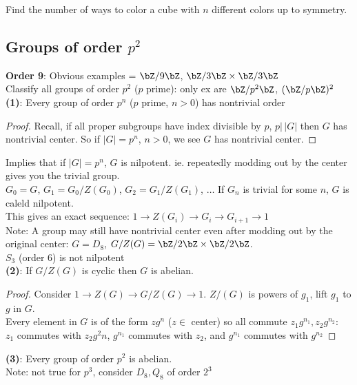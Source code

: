 \begin{example}
    Find the number of ways to color a cube with $n$ different colors up to symmetry. 
\end{example}

\subsection{Groups of order $p^2$} 

\textbf{Order 9}: Obvious examples = $\bZ/9\bZ$, $\bZ/3\bZ \times \bZ/3\bZ$ \\

\noindent
Classify all groups of order $p^2$ ($p$ prime): only ex are $\bZ/p^2\bZ$, $(\bZ/p\bZ)^2$ \\
\textbf{(1)}: Every group of order $p^n$ ($p$ prime, $n >0$) has nontrivial order 
\begin{proof}
        Recall, if all proper subgroups have index divisible by $p$, $p | \, |G|$ then $G$ has nontrivial center. So if $|G|=p^n$, $n>0$, we see $G$ has nontrivial center. 
\end{proof} 

\noindent
Implies that if $|G|=p^n$, $G$ is nilpotent. ie. repeatedly modding out by the center gives you the trivial group. \\
$G_0 = G$, $G_1 = G_0/Z(G_0)$, $G_2 = G_1/Z(G_1)$, $\ldots$ If $G_n$ is trivial for some $n$, $G$ is caleld nilpotent. \\
This gives an exact sequence: $1 \to Z(G_i) \to G_i \to G_{i+1} \to 1$ \\
Note: A group may still have nontrivial center even after modding out by the original center: $G= D_8$, $G/Z(G) = \bZ/2\bZ \times \bZ/2\bZ$. \\
$S_3$ (order 6) is not nilpotent \\

\noindent
\textbf{(2)}: If $G/Z(G)$ is cyclic then $G$ is abelian. 

\begin{proof}
    Consider $1 \to Z(G) \to G/Z(G) \to 1$. $Z/(G)$ is powers of $g_1$, lift $g_1$ to $g$ in $G$. \\
    Every element in $G$ is of the form $zg^n$ ($z \in$ center) so all commute $z_1g^{n_1}, z_2g^{n_2}$: \\
    $z_1$ commutes with $z_2g^2n$, $g^{n_1}$ commutes with $z_2$, and $g^{n_1}$ commutes with $g^{n_2}$
\end{proof}

\noindent
\textbf{(3)}: Every group of order $p^2$ is abelian. \\
Note: not true for $p^3$, consider $D_8, Q_8$ of order $2^3$

